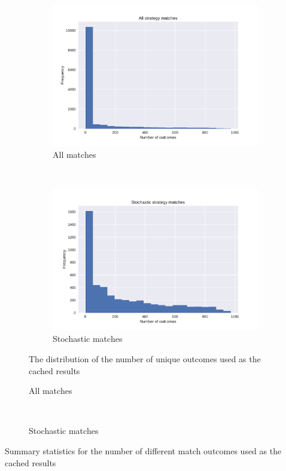 \documentclass{article}
\begin{document}
\begin{figure}[!hbtp]
    \centering
    \begin{subfigure}[t]{.5\textwidth}
        \centering
        \includegraphics[width=.9\textwidth]{./img/number_of_match_outcomes.pdf}
        \caption{All matches}
    \end{subfigure}%
    ~
    \begin{subfigure}[t]{.5\textwidth}
        \centering
        \includegraphics[width=.9\textwidth]{./img/number_of_stochastic_match_outcomes.pdf}
        \caption{Stochastic matches}
    \end{subfigure}%
    \caption{The distribution of the number of unique outcomes used as the
    cached results}
    \label{fig:number_of_stochastic_match_outcomes}
\end{figure}


\begin{table}[!hbtp]
    \centering
    \begin{subfigure}[t]{.5\textwidth}
        \centering
        
        \caption{All matches}
    \end{subfigure}%
    ~
    \begin{subfigure}[t]{.5\textwidth}
        \centering
        
        \caption{Stochastic matches}
    \end{subfigure}%
    \caption{Summary statistics for the number of different match outcomes used
    as the cached results}
    \label{tbl:number_of_stochastic_match_outcomes}
\end{table}
\end{document}
